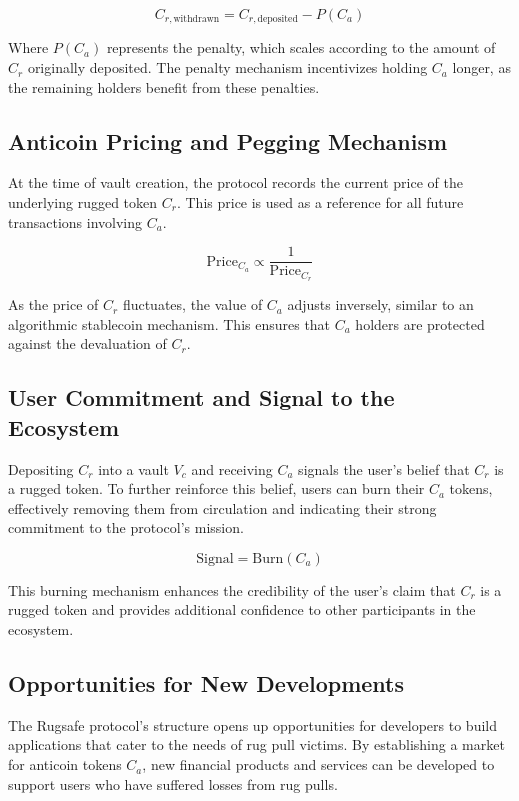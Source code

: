 \documentclass{article}
\begin{document}
\begin{equation}
C_{r,\text{withdrawn}} = C_{r,\text{deposited}} - P(C_a)
\end{equation}

Where $P(C_a)$ represents the penalty, which scales according to the amount of $C_r$ originally deposited. The penalty mechanism incentivizes holding $C_a$ longer, as the remaining holders benefit from these penalties.

\subsection{Anticoin Pricing and Pegging Mechanism}
At the time of vault creation, the protocol records the current price of the underlying rugged token $C_r$. This price is used as a reference for all future transactions involving $C_a$.

\begin{equation}
\text{Price}_{C_a} \propto \frac{1}{\text{Price}_{C_r}}
\end{equation}

As the price of $C_r$ fluctuates, the value of $C_a$ adjusts inversely, similar to an algorithmic stablecoin mechanism. This ensures that $C_a$ holders are protected against the devaluation of $C_r$.

\subsection{User Commitment and Signal to the Ecosystem}
Depositing $C_r$ into a vault $V_c$ and receiving $C_a$ signals the user's belief that $C_r$ is a rugged token. To further reinforce this belief, users can burn their $C_a$ tokens, effectively removing them from circulation and indicating their strong commitment to the protocol's mission.

\begin{equation}
\text{Signal} = \text{Burn}(C_a)
\end{equation}

This burning mechanism enhances the credibility of the user's claim that $C_r$ is a rugged token and provides additional confidence to other participants in the ecosystem.

\subsection{Opportunities for New Developments}
The Rugsafe protocol's structure opens up opportunities for developers to build applications that cater to the needs of rug pull victims. By establishing a market for anticoin tokens $C_a$, new financial products and services can be developed to support users who have suffered losses from rug pulls.
\end{document}
